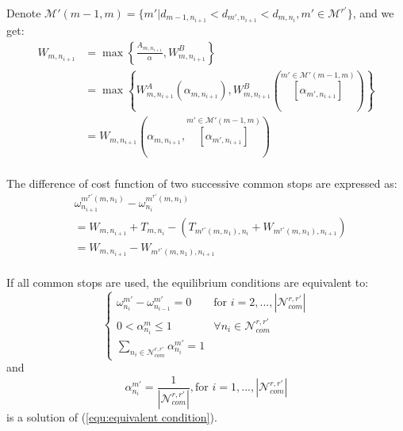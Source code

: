 \documentclass[smallextended]{svjour3}       %
\begin{document}
\begin{Abstract}
Denote $\mathcal{M'}(m-1,m) = \{m'|d_{m-1,n_{i+1}}<d_{m',n_{i+1}}<d_{m,n_{i}},m'\in\mathcal{M}^{r'}\}$, and we get:
\begin{equation}
    \begin{split}
        W_{m,n_{i+1}} &= \max \left\{\frac{A_{m,n_{i+1}}}{\alpha},W_{m,n_{i+1}}^{B} \right\}\\
        &= \max \left\{W^{A}_{m,n_{i+1}}\left(\alpha_{m,n_{i+1}}\right),
        W_{m,n_{i+1}}^{B}(\overset{m'\in\mathcal{M'}(m-1,m)}{\left[\alpha_{m',n_{i+1}}\right]}) \right\}\\
        &=W_{m,n_{i+1}}\left(\alpha_{m,n_{i+1}},\overset{m'\in\mathcal{M'}(m-1,m)}{\left[\alpha_{m',n_{i+1}}\right]}\right)\\
    \end{split}
\end{equation}

The difference of cost function of two successive common stops are expressed as:
\begin{equation}
    \begin{split}
        &\omega_{n_{i+1}}^{m^{r'}\left(m,n_{1}\right)} - \omega_{n_{i}}^{m^{r'}\left(m,n_{1}\right)}\\
        &=W_{m,n_{i+1}} + T_{m,n_{i}} - \left(T_{m^{r'}(m,n_{1}),n_{i}} + W_{m^{r'}\left(m,n_{1}\right),n_{i+1}}\right) \\
        &=W_{m,n_{i+1}}-W_{m^{r'}\left(m,n_{1}\right),n_{i+1}}\\
    \end{split}
\end{equation}

If all common stops are used, the equilibrium conditions are equivalent to:
\begin{equation}
    \label{equ:equivalent condition}
    \begin{cases}
        \omega_{n_{i}}^{m'} - \omega_{n_{i-1}}^{m'} = 0 & \text{for } i=2,...,\left|\mathcal{N}_{com}^{r,r'}\right|\\
        0 < \alpha_{n_{i}}^{m} \leq 1 &\forall n_{i}\in \mathcal{N}_{com}^{r,r'}\\
        \sum\limits_{n_{i}\in \mathcal{N}_{com}^{r,r'}} \alpha_{n_{i}}^{m'} = 1
    \end{cases}
\end{equation} 
and  
\begin{equation}
    \alpha_{n_{i}}^{m'} = \frac{1}{\left|\mathcal{N}_{com}^{r,r'}\right|},\text{for }i=1,...,\left|\mathcal{N}_{com}^{r,r'}\right|
\end{equation}
is a solution of (\ref{equ:equivalent condition}).


\end{Abstract}
\end{document}
